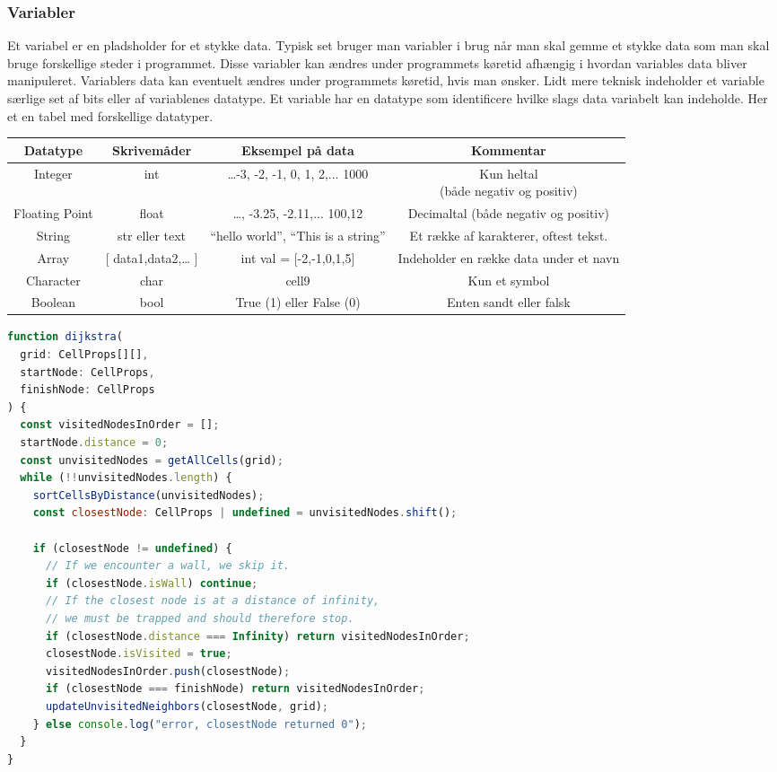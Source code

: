 \documentclass[12pt]{article}
\begin{document}
\subsubsection{Variabler}
Et variabel er en pladsholder for et stykke data. Typisk set bruger man variabler i brug når man skal gemme et stykke data som man skal bruge forskellige steder i programmet. Disse variabler kan ændres under programmets køretid afhængig i hvordan variables data bliver manipuleret. Variablers data kan eventuelt ændres under programmets køretid, hvis man ønsker. Lidt mere teknisk indeholder et variable særlige set af bits eller af variablenes datatype. Et variable har en datatype som identificere hvilke slags data variabelt kan indeholde. Her et en tabel med forskellige datatyper.
\begin{table}
  \centering
  \begin{tabular}{ |c|c|c|c| } 
   \hline
   \textbf{Datatype} & \textbf{Skrivemåder} & \textbf{Eksempel på data} & \textbf{Kommentar} \\ 
   \hline
   Integer & int & \small{…-3, -2, -1, 0, 1, 2,... 1000} & \shortstack{Kun heltal\\ \footnotesize{(både negativ og positiv)}} \\
   \hline
   Floating Point & float & …, -3.25, -2.11,... 100,12  & Decimaltal (både negativ og positiv) \\ 
   \hline
   String & str eller text & “hello world”, “This is a string”  & Et række af karakterer, oftest tekst. \\ 
   \hline
   Array & [ data1,data2,… ] & int val = [-2,-1,0,1,5] & Indeholder en række data under et navn \\ 
   \hline
   Character & char & cell9  & Kun et symbol \\ 
   \hline
   Boolean & bool & True (1) eller False (0)  & Enten sandt eller falsk \\ 
   \hline
  \end{tabular}
\end{table}

\begin{lstlisting}[language=JavaScript, caption=Dijkstra's Algoritme]
function dijkstra(
  grid: CellProps[][],
  startNode: CellProps,
  finishNode: CellProps
) {
  const visitedNodesInOrder = [];
  startNode.distance = 0;
  const unvisitedNodes = getAllCells(grid);
  while (!!unvisitedNodes.length) {
    sortCellsByDistance(unvisitedNodes);
    const closestNode: CellProps | undefined = unvisitedNodes.shift();

    if (closestNode != undefined) {
      // If we encounter a wall, we skip it.
      if (closestNode.isWall) continue;
      // If the closest node is at a distance of infinity,
      // we must be trapped and should therefore stop.
      if (closestNode.distance === Infinity) return visitedNodesInOrder;
      closestNode.isVisited = true;
      visitedNodesInOrder.push(closestNode);
      if (closestNode === finishNode) return visitedNodesInOrder;
      updateUnvisitedNeighbors(closestNode, grid);
    } else console.log("error, closestNode returned 0");
  }
}
\end{lstlisting}
\end{document}
